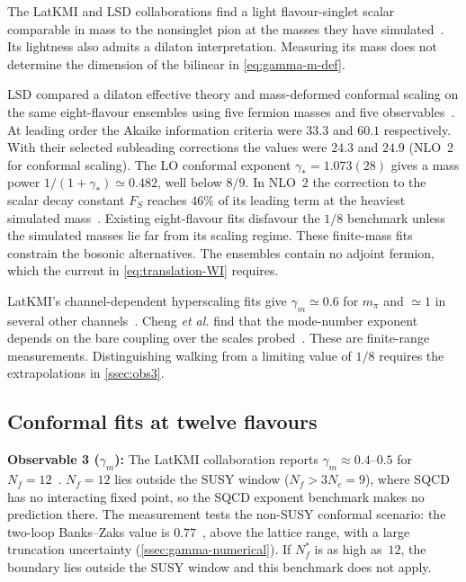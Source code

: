 \documentclass[11pt,a4paper]{article}
\theoremstyle{plain}
\theoremstyle{definition}
\theoremstyle{remark}
\newcommand{\Nc}{N_{\!c}}
\newcommand{\Nf}{N_{\!f}}
\newcommand{\Nfstar}{\Nf^*}
\begin{document}
The LatKMI and LSD collaborations find a light flavour-singlet scalar
comparable in mass to the nonsinglet pion at the masses they have
simulated~\cite{LatKMI2014_Nf8,LSD2016_Nf8}.  Its lightness also
admits a dilaton interpretation.  Measuring its mass does not determine
the dimension of the bilinear in \cref{eq:gamma-m-def}.

LSD compared a dilaton effective theory and mass-deformed conformal
scaling on the same eight-flavour ensembles using five fermion
masses and five observables~\cite{LSD2023dilaton}. At leading order
the Akaike information criteria were $33.3$ and $60.1$ respectively.
With their selected subleading corrections the values were $24.3$
and $24.9$ (NLO~2 for conformal scaling). The LO conformal exponent
$\gamma_*=1.073(28)$ gives a mass power $1/(1+\gamma_*)\simeq0.482$,
well below $8/9$. In NLO~2 the correction to the scalar decay
constant $F_S$ reaches $46\%$ of its leading term at the heaviest
simulated mass~\cite[Table~II and Sec.~IV]{LSD2023dilaton}.
Existing eight-flavour fits disfavour the $1/8$ benchmark unless
the simulated masses lie far from its scaling regime. These finite-mass fits constrain the bosonic alternatives.
The ensembles contain no adjoint fermion, which the current in
\cref{eq:translation-WI} requires.

LatKMI's channel-dependent hyperscaling fits give $\gamma_m\simeq0.6$
for $m_\pi$ and $\simeq1$ in several other channels~\cite{LatKMI2017_Nf8}.
Cheng \emph{et al.} find that the mode-number exponent depends on the
bare coupling over the scales probed~\cite{Cheng2013}.  These are
finite-range measurements.  Distinguishing walking from a limiting
value of $1/8$ requires the extrapolations in \cref{ssec:obs3}.

\subsection{Conformal fits at twelve flavours}

\textbf{Observable 3 ($\gamma_m$):}
The LatKMI collaboration reports $\gamma_m \approx 0.4$--$0.5$ for
$\Nf = 12$~\cite{LatKMI2012_Nf12}.  $\Nf = 12$ lies outside the SUSY
window ($\Nf > 3\Nc = 9$), where SQCD has no interacting fixed point,
so the SQCD exponent benchmark makes no prediction there.
The measurement tests the non-SUSY conformal scenario: the two-loop
Banks--Zaks value is $0.77$~\cite{RyttovShrock2011}, above the lattice
range, with a large truncation uncertainty
(\cref{ssec:gamma-numerical}).  If $\Nfstar$ is as high as~$12$, the
boundary lies outside the SUSY window and this benchmark does not apply.
\end{document}
